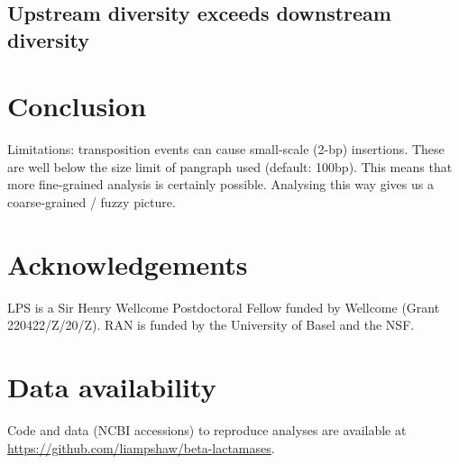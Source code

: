 \documentclass[aps,rmp,preprint,superscriptaddress,10pt,twocolumn]{revtex4-1}
\begin{document}
\subsection{Upstream diversity exceeds downstream diversity}

% 

\section{Conclusion}

Limitations: transposition events can cause small-scale (2-bp) insertions. These are well below the size limit of pangraph used (default: 100bp). This means that more fine-grained analysis is certainly possible. Analysing this way gives us a coarse-grained / fuzzy picture. 

\section{Acknowledgements}

\noindent LPS is a Sir Henry Wellcome Postdoctoral Fellow funded by Wellcome (Grant 220422/Z/20/Z). RAN is funded by the University of Basel and the NSF. 



\section{Data availability}

\noindent Code and data (NCBI accessions) to reproduce analyses are available at \url{https://github.com/liampshaw/beta-lactamases}. 

{}
\end{document}
